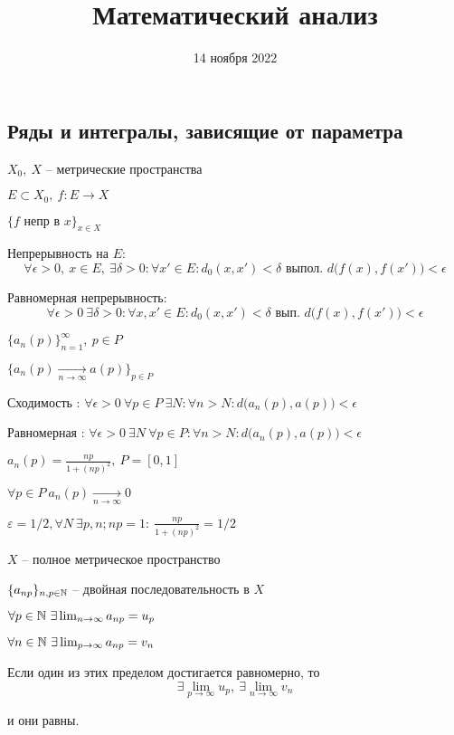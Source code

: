 


    \title{Математический анализ}
    \date{14 ноября 2022}

    \pagebreak

    \subsection*{Ряды и интегралы, зависящие от параметра}

    $X_0, \ X$ -- метрические пространства
    \par $E \subset X_0, \ f : E \rightarrow X$
    \par $\{f \text{ непр в } x\}_{x \in X}$
    \par Непрерывность на $E$:
    \[
        \forall \epsilon > 0, \ x \in E, \ \exists \delta > 0 : \forall x' \in E : d_0(x, x') < \delta \text{ выпол. } d\big(f(x), f(x')\big) < \epsilon    
    \]
    \par Равномерная непрерывность:
    \[
        \forall \epsilon > 0 \ \exists \delta > 0 : \forall x, x' \in E : d_0(x, x') < \delta \text{ вып. } d\big(f(x), f(x')\big) < \epsilon    
    \]

    \par $\{a_n(p)\}_{n = 1}^\infty, \ p \in P$
    \par $\{a_n(p) \xrightarrow[n \rightarrow \infty]{} a(p)\}_{p \in P}$
    \par Сходимость : $\forall \epsilon > 0 \ \forall p \in P \ \exists N : \forall n > N : d\big(a_n(p), a(p)\big) < \epsilon$
    \par Равномерная : $\forall \epsilon > 0 \ \exists N \ \forall p \in P : \forall n > N : d\big(a_n(p), a(p)\big) < \epsilon$

    \begin{illustration}
        $a_n(p) = \frac{np}{1 + (np)^2}, \ P = [0, 1]$

        $\forall p \in P \ a_n(p) \underset{n\to \infty}{\longrightarrow} 0$
  
        $\varepsilon = 1/2, \forall N \ \exists p, n; np=1:\ \frac{np}{1+(np)^2} = 1/2$    
    \end{illustration}

    \begin{theorem}
        $X$ -- полное метрическое пространство
        \par $\{a_{np}\}_{n, p \in \mathbb{N}}$ -- двойная последовательность в $X$
        \par \quad $\forall p \in \mathbb{N} \ \exists \lim_{n \rightarrow \infty} a_{np} = u_p$
        \par \quad $\forall n \in \mathbb{N} \ \exists \lim_{p \rightarrow \infty} a_{np} = v_n$
        \par Если один из этих пределом достигается равномерно, то
        \[
            \exists \lim_{p \rightarrow \infty} u_p, \ \exists \lim_{n \rightarrow \infty} v_n
        \]
        \par и они равны.
    \end{theorem}


